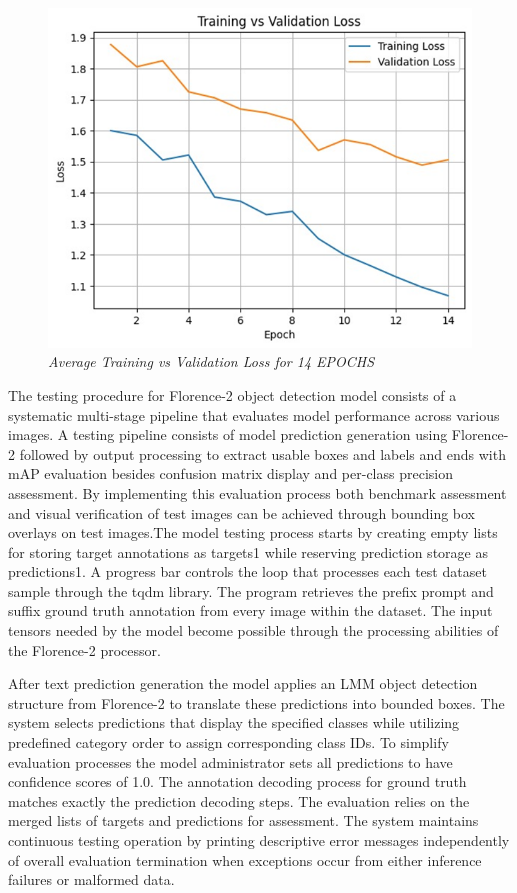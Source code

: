 \documentclass[fleqn,10pt,lineno]{wlpeerj}
\begin{document}
\begin{figure} [H]
    \centering
    \includegraphics[width=0.5\linewidth]{train_val_loss.png}
    \caption{\textit{Average Training vs Validation Loss for 14 EPOCHS}
    \label{fig:avg-training-loss}
}
\end{figure}

The testing procedure for Florence-2 object detection model consists of a systematic multi-stage pipeline that evaluates model performance across various images. A testing pipeline consists of model prediction generation using Florence-2 followed by output processing to extract usable boxes and labels and ends with mAP evaluation besides confusion matrix display and per-class precision assessment. By implementing this evaluation process both benchmark assessment and visual verification of test images can be achieved through bounding box overlays on test images.The model testing process starts by creating empty lists for storing target annotations as targets1 while reserving prediction storage as predictions1. A progress bar controls the loop that  processes each test dataset sample through the tqdm library. The program retrieves the prefix prompt and suffix ground truth annotation from every image within the dataset. The input tensors needed by the model become possible through the processing abilities of the Florence-2 processor.  

After text prediction generation the model applies an LMM object detection structure from Florence-2 to translate these predictions into bounded boxes. The system selects predictions that display the specified classes while utilizing predefined category order to assign corresponding class IDs. To simplify evaluation processes the model administrator sets all predictions to have confidence scores of 1.0. The annotation decoding process for ground truth matches exactly the prediction decoding steps. The evaluation relies on the merged lists of targets and predictions for assessment. The system maintains continuous testing operation by printing descriptive error messages independently of overall evaluation termination when exceptions occur from either inference failures or malformed data.  
\end{document}
